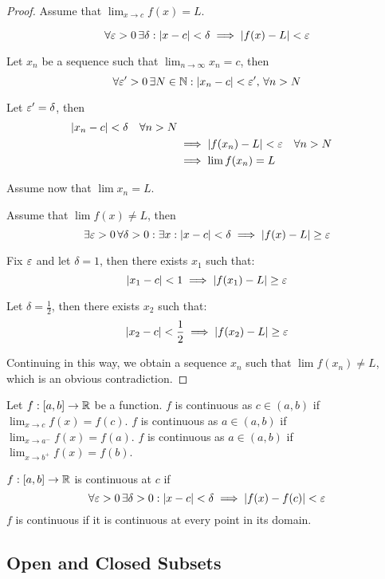 \documentclass[a4paper,10pt]{article}
\begin{document}
\begin{proof}
	Assume that $\lim_{x \to c}f(x) = L$.

	\[
		\forall \varepsilon > 0 \, \exists \delta :
		|x-c| < \delta \implies |f(x)-L| < \varepsilon
	\]

	Let $x_n$ be a sequence such that $\lim_{n \to\infty}x_n = c$, then
	\[
		\forall \varepsilon' > 0 \, \exists N \in \mathbb{N} :
		|x_n - c| < \varepsilon', \, \forall n > N
	\]

	Let $\varepsilon' = \delta$, then
	\begin{align*}
		|x_n - c| < \delta \quad \forall n > N \\
		&\implies |f(x_n) - L| < \varepsilon \quad \forall n > N \\
		&\implies \lim f(x_n) = L
	\end{align*}

	Assume now that $\lim x_n = L$.

	Assume that $\lim f(x) \neq L$, then
	\[
		\exists \varepsilon > 0 \, \forall \delta > 0 : \exists x :
		|x-c| < \delta \implies |f(x) - L| \geq \varepsilon
	\]

	Fix $\varepsilon$ and let $\delta = 1$, then there exists $x_1$ such that:
	\[
		|x_1 - c| < 1 \implies |f(x_1) - L| \geq \varepsilon
	\]

	Let $\delta = \frac{1}{2}$, then there exists $x_2$ such that:
	\[
		|x_2 - c| < \frac{1}{2} \implies |f(x_2) - L| \geq \varepsilon
	\]

	Continuing in this way, we obtain a sequence $x_n$ such that
	$\lim f(x_n) \neq L$, which is an obvious contradiction.
\end{proof}

\begin{rem}
	Let $f:[a,b] \to \mathbb{R}$ be a function. $f$ is continuous as $c \in
	(a,b)$ if $\lim_{x \to c} f(x) = f(c)$.
	$f$ is continuous as $a \in (a,b)$ if $\lim_{x \to a^-} f(x) =
	f(a)$.
	$f$ is continuous as $a \in (a,b)$ if $\lim_{x \to b^+} f(x) =
	f(b)$.
\end{rem}

\begin{defn}[Continuous]
	$f:[a,b] \to \mathbb{R}$ is continuous at $c$ if
	\[
		\forall \varepsilon > 0 \, \exists \delta > 0 :
		|x-c| < \delta \implies |f(x)-f(c)| < \varepsilon
	\]
	$f$ is continuous if it is continuous at every point in its
	domain.
\end{defn}

\subsection{Open and Closed Subsets}
\end{document}
